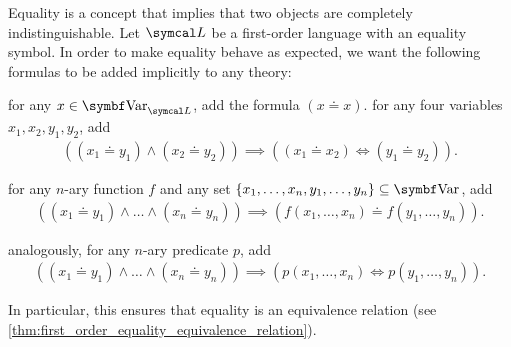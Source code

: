 \begin{note}\label{note:first_order_equality}\cite[definition 5.1]{Nerode2012}
  Equality is a concept that implies that two objects are completely indistinguishable. Let \( \Cal{L} \) be a first-order language with an equality symbol. In order to make equality behave as expected, we want the following formulas to be added implicitly to any theory:

  \begin{defenum}
     for any \( x \in \Bold{Var}_{\Cal{L}} \), add the formula \( (x \doteq x) \).
     for any four variables \( x_1, x_2, y_1, y_2 \), add
    \begin{align*}
      ((x_1 \doteq y_1) \land (x_2 \doteq y_2)) \implies ((x_1 \doteq x_2) \iff (y_1 \doteq y_2)).
    \end{align*}

     for any \( n \)-ary function \( f \) and any set \( \{ x_1, \ldots, x_n, y_1, \ldots, y_n \} \subseteq \Bold{Var} \), add
    \begin{align*}
      ((x_1 \doteq y_1) \land \ldots \land (x_n \doteq y_n)) \implies (f(x_1, \ldots, x_n) \doteq f(y_1, \ldots, y_n)).
    \end{align*}

     analogously, for any \( n \)-ary predicate \( p \), add
    \begin{align*}
      ((x_1 \doteq y_1) \land \ldots \land (x_n \doteq y_n)) \implies (p(x_1, \ldots, x_n) \iff p(y_1, \ldots, y_n)).
    \end{align*}
  \end{defenum}

  In particular, this ensures that equality is an equivalence relation (see \cref{thm:first_order_equality_equivalence_relation}).
\end{note}

